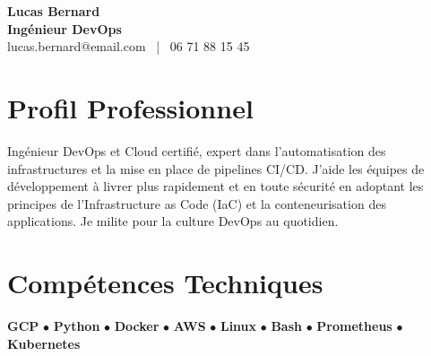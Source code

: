 \documentclass[11pt,a4paper]{article}
\begin{document}
\begin{center}
    {\Huge \textbf{Lucas Bernard}} \\[0.2cm]
    {\Large \textbf{Ingénieur DevOps}} \\[0.1cm]
    lucas.bernard@email.com \ | \ 06 71 88 15 45
\end{center}

\vspace{0.3cm}

\section*{Profil Professionnel}
\noindent
Ingénieur DevOps et Cloud certifié, expert dans l'automatisation des infrastructures et la mise en place de pipelines CI/CD. J'aide les équipes de développement à livrer plus rapidement et en toute sécurité en adoptant les principes de l'Infrastructure as Code (IaC) et la conteneurisation des applications. Je milite pour la culture DevOps au quotidien.

\vspace{0.3cm}

\section*{Compétences Techniques}
\noindent
\textbf{GCP} $\bullet$ \textbf{Python} $\bullet$ \textbf{Docker} $\bullet$ \textbf{AWS} $\bullet$ \textbf{Linux} $\bullet$ \textbf{Bash} $\bullet$ \textbf{Prometheus} $\bullet$ \textbf{Kubernetes}

\vspace{0.3cm}

\end{document}
